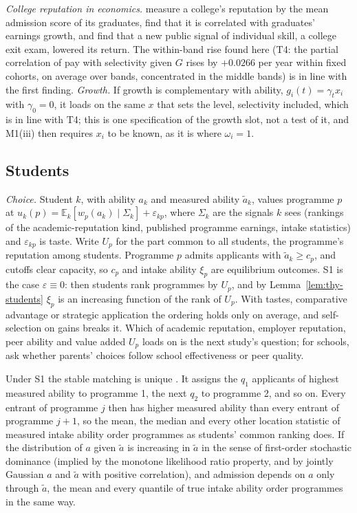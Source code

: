 \emph{College reputation in economics.} \citet{macleod2017big} measure a college's reputation by the mean admission
score of its graduates, find that it is correlated with graduates' earnings growth, and find that a new public signal
of individual skill, a college exit exam, lowered its return. The within-band rise found here (T4: the partial
correlation of pay with selectivity given $G$ rises by $+0.0266$  per year within fixed cohorts,
on average over bands, concentrated in the middle bands) is in line with the first finding. \emph{Growth.} If growth
is complementary with ability, $g_i(t)=\gamma_tx_i$ with $\gamma_0=0$, it loads on the same $x$ that sets the level,
selectivity included, which is in line with T4; this is one specification of the growth slot, not a test of it, and
M1(iii) then requires $x_i$ to be known, as it is where $\omega_i=1$.

\subsection{Students}\label{app:thy:students}

\emph{Choice.} Student $k$, with ability $a_k$ and measured ability $\tilde a_k$, values programme $p$ at
$u_k(p)=\mathbb E_k[w_p(a_k)\mid\Sigma_k]+\varepsilon_{kp}$, where $\Sigma_k$ are the signals $k$ sees (rankings of
the academic-reputation kind, published programme earnings, intake statistics) and $\varepsilon_{kp}$ is taste.
Write $U_p$ for the part common to all students, the programme's reputation among students. Programme $p$ admits
applicants with $\tilde a_k\ge c_p$, and cutoffs clear capacity, so $c_p$ and intake ability $\xi_p$ are
equilibrium outcomes. S1 is the case $\varepsilon\equiv0$: then students rank programmes by $U_p$, and by
Lemma~\ref{lem:thy-students} $\xi_p$ is an increasing function of the rank of $U_p$. With tastes, comparative
advantage or strategic application the ordering holds only on average, and self-selection on gains
\citep{kirkeboen2016field} breaks it. Which of academic reputation, employer reputation, peer ability and value added
$U_p$ loads on is the next study's question; for schools, \citet{abdulkadiroglu2020parents} ask whether parents'
choices follow school effectiveness or peer quality.

\begin{thylemma}\label{lem:thy-students}
Under S1 the stable matching is unique \citep{gale1962college}. It assigns the $q_1$ applicants of highest measured
ability to programme 1, the next $q_2$ to programme 2, and so on. Every entrant of programme $j$ then has higher
measured ability than every entrant of programme $j+1$, so the mean, the median and every other location statistic of
measured intake ability order programmes as students' common ranking does. If the distribution of $a$ given
$\tilde a$ is increasing in $\tilde a$ in the sense of first-order stochastic dominance (implied by the monotone
likelihood ratio property, and by jointly Gaussian $a$ and $\tilde a$ with positive correlation), and admission
depends on $a$ only through $\tilde a$, the mean and every quantile of true intake ability order programmes in the
same way.
\end{thylemma}

